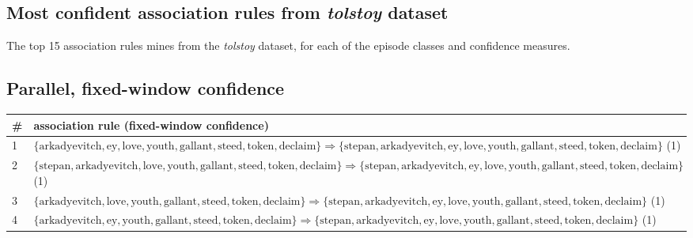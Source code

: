 \begin{appendices}

\chapter{%
Most confident association rules from \emph{tolstoy} dataset
}

The top 15 association rules mines from the \emph{tolstoy} dataset, for each of the episode classes and confidence measures.

\section{Parallel, fixed-window confidence}

\begin{longtable}{p{20pt}|p{\dimexpr\textwidth-\tabcolsep-20pt\relax}}
\# & association rule (fixed-window confidence) \\
\hline
1 & $ \{ \text{arkadyevitch},\allowbreak\text{ey},\allowbreak\text{love},\allowbreak\text{youth},\allowbreak\text{gallant},\allowbreak\text{steed},\allowbreak\text{token},\allowbreak\text{declaim} \} \Rightarrow \{ \text{stepan},\allowbreak\text{arkadyevitch},\allowbreak\text{ey},\allowbreak\text{love},\allowbreak\text{youth},\allowbreak\text{gallant},\allowbreak\text{steed},\allowbreak\text{token},\allowbreak\text{declaim} \} $ (1) \\
2 & $ \{ \text{stepan},\allowbreak\text{arkadyevitch},\allowbreak\text{love},\allowbreak\text{youth},\allowbreak\text{gallant},\allowbreak\text{steed},\allowbreak\text{token},\allowbreak\text{declaim} \} \Rightarrow \{ \text{stepan},\allowbreak\text{arkadyevitch},\allowbreak\text{ey},\allowbreak\text{love},\allowbreak\text{youth},\allowbreak\text{gallant},\allowbreak\text{steed},\allowbreak\text{token},\allowbreak\text{declaim} \} $ (1) \\
3 & $ \{ \text{arkadyevitch},\allowbreak\text{love},\allowbreak\text{youth},\allowbreak\text{gallant},\allowbreak\text{steed},\allowbreak\text{token},\allowbreak\text{declaim} \} \Rightarrow \{ \text{stepan},\allowbreak\text{arkadyevitch},\allowbreak\text{ey},\allowbreak\text{love},\allowbreak\text{youth},\allowbreak\text{gallant},\allowbreak\text{steed},\allowbreak\text{token},\allowbreak\text{declaim} \} $ (1) \\
4 & $ \{ \text{arkadyevitch},\allowbreak\text{ey},\allowbreak\text{youth},\allowbreak\text{gallant},\allowbreak\text{steed},\allowbreak\text{token},\allowbreak\text{declaim} \} \Rightarrow \{ \text{stepan},\allowbreak\text{arkadyevitch},\allowbreak\text{ey},\allowbreak\text{love},\allowbreak\text{youth},\allowbreak\text{gallant},\allowbreak\text{steed},\allowbreak\text{token},\allowbreak\text{declaim} \} $ (1) \\

\end{longtable}
\end{appendices}
